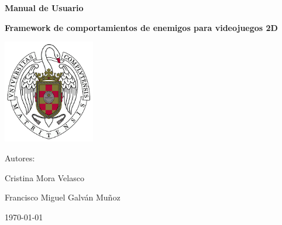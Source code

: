 \begin{titlepage}
    \centering
    \vfill
    {\Huge \textbf{Manual de Usuario} \par}
    {\LARGE \textbf{Framework de comportamientos de enemigos
para videojuegos 2D} \par}
    \vfill
    \includegraphics[width=0.3\textwidth]{universidad_logo.png} \par
    {\Large Autores:\par Cristina Mora Velasco \par Francisco Miguel Galván Muñoz \par}
    \vfill
    \today
    \vfill
\end{titlepage}